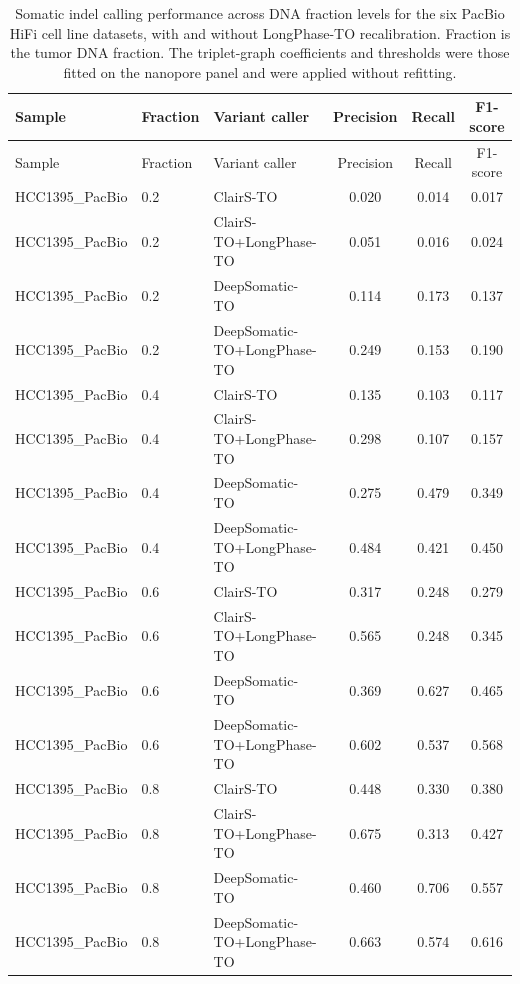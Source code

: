 \documentclass[pdflatex,sn-nature]{sn-jnl}
\begin{document}
{\small
\begin{longtable}{@{}lllccc@{}}
  \caption[Somatic indel calling performance on the PacBio HiFi panel]%
  {Somatic indel calling performance across DNA fraction levels for the six PacBio HiFi
  cell line datasets, with and without LongPhase-TO recalibration. Fraction is the tumor
  DNA fraction. The triplet-graph coefficients and thresholds were those fitted on the
  nanopore panel and were applied without refitting.}
  \label{tab:pacbio_somatic_indel}\\
  \toprule
  Sample & Fraction & Variant caller & Precision & Recall & F1-score \\
  \midrule
  \endfirsthead
  \toprule
  Sample & Fraction & Variant caller & Precision & Recall & F1-score \\
  \midrule
  \endhead
  \bottomrule
  \endlastfoot
  HCC1395\_PacBio & 0.2 & ClairS-TO & 0.020 & 0.014 & 0.017 \\
  HCC1395\_PacBio & 0.2 & ClairS-TO+LongPhase-TO & 0.051 & 0.016 & 0.024 \\
  HCC1395\_PacBio & 0.2 & DeepSomatic-TO & 0.114 & 0.173 & 0.137 \\
  HCC1395\_PacBio & 0.2 & DeepSomatic-TO+LongPhase-TO & 0.249 & 0.153 & 0.190 \\
  HCC1395\_PacBio & 0.4 & ClairS-TO & 0.135 & 0.103 & 0.117 \\
  HCC1395\_PacBio & 0.4 & ClairS-TO+LongPhase-TO & 0.298 & 0.107 & 0.157 \\
  HCC1395\_PacBio & 0.4 & DeepSomatic-TO & 0.275 & 0.479 & 0.349 \\
  HCC1395\_PacBio & 0.4 & DeepSomatic-TO+LongPhase-TO & 0.484 & 0.421 & 0.450 \\
  HCC1395\_PacBio & 0.6 & ClairS-TO & 0.317 & 0.248 & 0.279 \\
  HCC1395\_PacBio & 0.6 & ClairS-TO+LongPhase-TO & 0.565 & 0.248 & 0.345 \\
  HCC1395\_PacBio & 0.6 & DeepSomatic-TO & 0.369 & 0.627 & 0.465 \\
  HCC1395\_PacBio & 0.6 & DeepSomatic-TO+LongPhase-TO & 0.602 & 0.537 & 0.568 \\
  HCC1395\_PacBio & 0.8 & ClairS-TO & 0.448 & 0.330 & 0.380 \\
  HCC1395\_PacBio & 0.8 & ClairS-TO+LongPhase-TO & 0.675 & 0.313 & 0.427 \\
  HCC1395\_PacBio & 0.8 & DeepSomatic-TO & 0.460 & 0.706 & 0.557 \\
  HCC1395\_PacBio & 0.8 & DeepSomatic-TO+LongPhase-TO & 0.663 & 0.574 & 0.616 \\

\end{longtable}}
\end{document}
